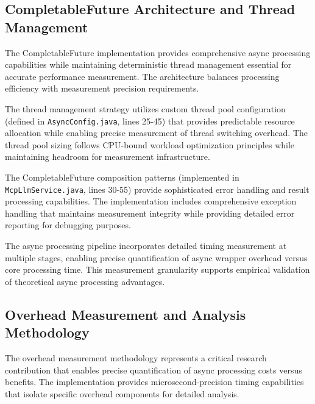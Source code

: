 
\subsection{CompletableFuture Architecture and Thread Management}

The CompletableFuture implementation provides comprehensive async processing capabilities while maintaining deterministic thread management essential for accurate performance measurement. The architecture balances processing efficiency with measurement precision requirements.

The thread management strategy utilizes custom thread pool configuration (defined in \texttt{AsyncConfig.java}, lines 25-45) that provides predictable resource allocation while enabling precise measurement of thread switching overhead. The thread pool sizing follows CPU-bound workload optimization principles while maintaining headroom for measurement infrastructure.


The CompletableFuture composition patterns (implemented in \texttt{McpLlmService.java}, lines 30-55) provide sophisticated error handling and result processing capabilities. The implementation includes comprehensive exception handling that maintains measurement integrity while providing detailed error reporting for debugging purposes.


The async processing pipeline incorporates detailed timing measurement at multiple stages, enabling precise quantification of async wrapper overhead versus core processing time. This measurement granularity supports empirical validation of theoretical async processing advantages.

\subsection{Overhead Measurement and Analysis Methodology}

The overhead measurement methodology represents a critical research contribution that enables precise quantification of async processing costs versus benefits. The implementation provides microsecond-precision timing capabilities that isolate specific overhead components for detailed analysis.

